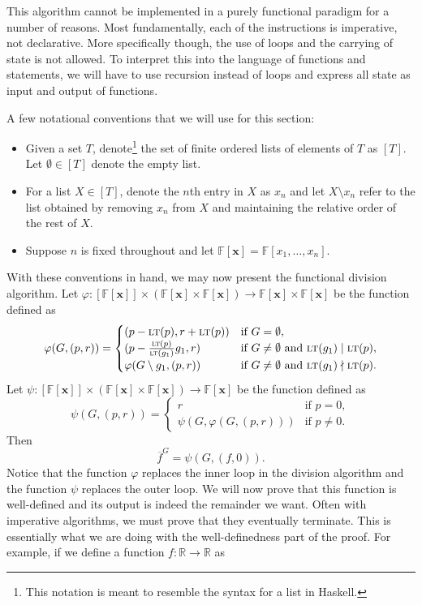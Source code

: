 \documentclass[MS, xcolor=dvipsnames]{wfuthesis}
\def\bF{\mathbb{F}}
\def\bR{\mathbb{R}}
\newcommand{\LT}{\ensuremath{\text{\sc lt}}}
\def\and{\text{ and }}
\theoremstyle{definition}
\def\p{\varphi}
\begin{document}
This algorithm cannot be implemented in a purely functional paradigm for a number of reasons. Most fundamentally, each of the instructions is imperative, not declarative. More specifically though, the use of loops and the carrying of state is not allowed. To interpret this into the language of functions and statements, we will have to use recursion instead of loops and express all state as input and output of functions. \par 
A few notational conventions that we will use for this section:
\begin{itemize}
  \item Given a set $T$, denote\footnote{This notation is meant to resemble the syntax for a list in Haskell.} the set of finite ordered lists of elements of $T$ as $[T]$. Let $\emptyset \in [T]$ denote the empty list. 
  \item For a list $X \in [T]$, denote the $n$th entry in $X$ as $x_n$ and let $X \setminus x_n$ refer to the list obtained by removing $x_n$ from $X$ and maintaining the relative order of the rest of $X$. 
  \item Suppose $n$ is fixed throughout and let $\bF[\mathbf x] = \bF[x_1,\dots,x_n]$. 
\end{itemize}
With these conventions in hand, we may now present the functional division algorithm. Let $\p: [\bF[\mathbf x]] \times \left( \bF[\mathbf x] \times \bF[\mathbf x] \right) \to \bF[\mathbf x] \times \bF[\mathbf x]$ be the function defined as 
\[ \p(G,(p,r)) = \begin{cases} (p-\LT(p),r+\LT(p)) &\text{if } G = \emptyset, \\ (p-\frac{\LT(p)}{\LT(g_1)}g_1,r) &\text{if } G \ne \emptyset \and \LT(g_1) \mid \LT(p), \\ \p(G\setminus g_1,(p,r)) &\text{if } G \ne \emptyset \and \LT(g_1) \nmid \LT(p). \end{cases} \]
Let $\psi: [\bF[\mathbf x]] \times \left( \bF[\mathbf x] \times \bF[\mathbf x] \right) \to \bF[\mathbf x]$ be the function defined as
\[ \psi(G,(p,r)) = \begin{cases} r &\text{if } p = 0, \\ \psi(G,\p(G,(p,r))) &\text{if } p \ne 0. \end{cases} \]
Then
\[ \overline f^{G} = \psi(G,(f,0)). \]
Notice that the function $\p$ replaces the inner loop in the division algorithm and the function $\psi$ replaces the outer loop. We will now prove that this function is well-defined and its output is indeed the remainder we want. Often with imperative algorithms, we must prove that they eventually terminate. This is essentially what we are doing with the well-definedness part of the proof. For example, if we define a function $f: \bR \to \bR$ as 
\end{document}
